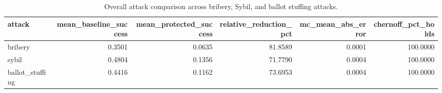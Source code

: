\begin{table}
\caption{Overall attack comparison across bribery, Sybil, and ballot stuffing attacks.}
\label{tab:attack_comparison}
\begin{tabular}{lrrrrr}
\toprule
attack & mean\_baseline\_success & mean\_protected\_success & relative\_reduction\_pct & mc\_mean\_abs\_error & chernoff\_pct\_holds \\
\midrule
bribery & 0.3501 & 0.0635 & 81.8589 & 0.0001 & 100.0000 \\
sybil & 0.4804 & 0.1356 & 71.7790 & 0.0004 & 100.0000 \\
ballot\_stuffing & 0.4416 & 0.1162 & 73.6953 & 0.0004 & 100.0000 \\
\bottomrule
\end{tabular}
\end{table}
